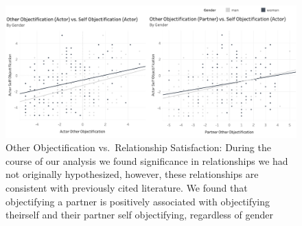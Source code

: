\documentclass[
  english,
  man,floatsintext]{apa6}
\begin{document}
\begin{figure}
\centering
\includegraphics{Images/OO_vs_RSA.png}
\caption{Other Objectification vs.~Relationship Satisfaction: During the course of our analysis we found significance in relationships we had not originally hypothesized, however, these relationships are consistent with previously cited literature. We found that objectifying a partner is positively associated with objectifying theirself and their partner self objectifying, regardless of gender}
\end{figure}
\end{document}
